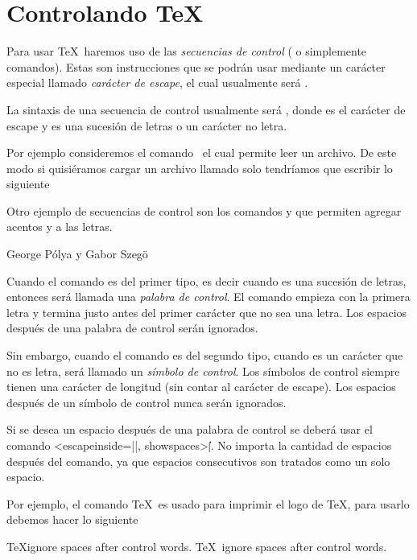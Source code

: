 \section{Controlando \TeX}

Para usar \TeX\ haremos uso de las \emph{secuencias de control} ( o simplemente comandos). Estas son instrucciones que se podrán usar mediante un carácter especial llamado \emph{carácter de escape}, el cual usualmente será \codeline{\ }.

La sintaxis de una secuencia de control usualmente será , donde  es el carácter de escape y  es una sucesión de letras o un carácter no letra.

Por ejemplo consideremos el comando \texcs\ el cual permite leer un archivo. De este modo si quisiéramos cargar un archivo llamado  solo tendríamos que escribir lo siguiente
\begin{texcode}
  
\end{texcode}

Otro ejemplo de secuencias de control son los comandos \codeline{\'} y \codeline{\"} que permiten agregar acentos y a las letras.
\begin{texexample}
  George P\'olya y Gabor Szeg\"o
\end{texexample}

Cuando el comando es del primer tipo, es decir cuando  es una sucesión de letras, entonces será llamada una \emph{palabra de control}. El comando empieza con la primera letra y termina justo antes del primer carácter que no sea una letra. Los espacios después de una palabra de control serán ignorados.

Sin embargo, cuando el comando es del segundo tipo, cuando  es un carácter que no es letra, será llamado un \emph{símbolo de control}. Los símbolos de control siempre tienen una carácter de longitud (sin contar al carácter de escape). Los espacios después de un símbolo de control nunca serán ignorados.

Si se desea un espacio después de una palabra de control se deberá usar el comando \texline<escapeinside=||, showspaces>{\| |}. No importa la cantidad de espacios después del comando, ya que espacios consecutivos son tratados como un solo espacio.

Por ejemplo, el comando \texcs\TeX\ es usado para imprimir el logo de \TeX, para usarlo debemos hacer lo siguiente
\begin{texexample}
  \TeX ignore spaces after control words.
  \TeX\ ignore spaces after control words.
\end{texexample}

